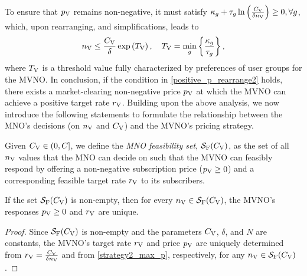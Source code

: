 \documentclass[12pt, draftclsnofoot, onecolumn]{IEEEtran}
\begin{document}
		To ensure that \( p_{\rm V} \) remains non-negative, it must satisfy $\kappa_g + \tau_g \ln\left(\frac{C_{\rm V}}{\delta n_{\rm V}}\right) \geq 0, \forall g$,
		which, upon rearranging, and simplifications, leads to
		\begin{equation}
			n_{\rm V} \leq  \frac{C_{\rm V}}{\delta}\exp\left(T_{\rm V}\right), \quad T_{\rm V}= \min_{g}\left\{\frac{\kappa_g}{\tau_g}\right\},		\label{positive_p_rearrange2}
		\end{equation}
		where $T_{\rm V}$ is a threshold value fully characterized by preferences of user groups for the MVNO.
		In conclusion, if the condition in \eqref{positive_p_rearrange2} holds, there exists a market-clearing non-negative price \( p_{\rm V} \) at which the MVNO can achieve a positive target rate \( r_{\rm V} \).
		Building upon the above analysis, we now introduce the following statements to formulate the relationship between the MNO's decisions (on $n_{\rm V}$ and $C_{\rm V}$) and the MVNO’s pricing strategy.
		\begin{definition}
			Given \( C_{\rm V} \in (0, C] \), we define the \textit{MNO feasibility set}, \( \mathcal{S}_{\rm F}(C_{\rm V}) \), as the set of all \(n_{\rm V}\) values that the MNO can decide on such that the MVNO can feasibly respond by offering a non-negative subscription price (\(p_{\rm V} \geq 0\)) and a corresponding feasible target rate \(r_{\rm V}\) to its subscribers.
		\end{definition}
		
		\begin{lemma}\label{lemma2}
			If the set \( \mathcal{S}_{\rm F}(C_{\rm V}) \) is non-empty, then for every \( n_{\rm V} \in \mathcal{S}_{\rm F}(C_{\rm V}) \), the MVNO’s responses \( p_{\rm V} \geq 0 \) and \( r_{\rm V} \) are unique.
		\end{lemma}
		\begin{proof}
			Since \( \mathcal{S}_{\rm F}(C_{\rm V}) \) is non-empty and the parameters \( C_{\rm V} \), \( \delta \), and \( N \) are constants, the MVNO's target rate \( r_{\rm V} \) and price \( p_{\rm V} \) are uniquely determined from $r_{\rm V}=\frac{C_{\rm V}}{\delta n_{\rm V}}$ and from \eqref{strategy2_max_p}, respectively, for any \( n_{\rm V} \in \mathcal{S}_{\rm F}(C_{\rm V}) \). 
		\end{proof}
		
\end{document}
